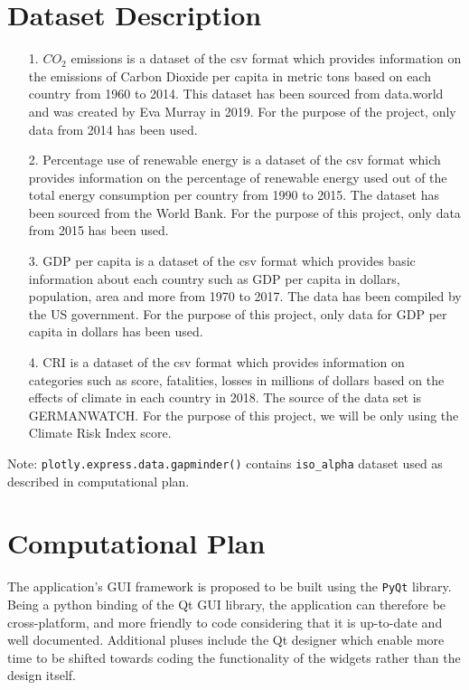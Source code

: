 \documentclass[fontsize=11pt]{article}
\begin{document}
\section*{Dataset Description}

\begin{enumerate}
 \item [1.] $CO_2$ emissions is a dataset of the csv format which provides information on the emissions of Carbon Dioxide per capita in metric tons based on each country from 1960 to 2014.
 This dataset has been sourced from data.world and was created by Eva Murray in 2019.
 For the purpose of the project, only data from 2014 has been used.
 \item[2.] Percentage use of renewable energy is a dataset of the csv format which provides information on the percentage of renewable energy used out of the total energy consumption per country from 1990 to 2015.
 The dataset has been sourced from the World Bank.
 For the purpose of this project, only data from 2015 has been used.
 \item[3.] GDP per capita is a dataset of the csv format which provides basic information about each country such as GDP per capita in dollars, population, area and more from 1970 to 2017. The data has been compiled by the US government.
 For the purpose of this project, only data for GDP per capita in dollars has been used.
 \item[4.] CRI is a dataset of the csv format which provides information on categories such as score, fatalities, losses in millions of dollars based on the effects of climate in each country in 2018.
 The source of the data set is GERMANWATCH. For the purpose of this project, we will be only using the Climate Risk Index score.
\end{enumerate}

Note: \texttt{plotly.express.data.gapminder()} contains \texttt{iso\_alpha} dataset used as described in computational plan.

\section*{Computational Plan}

The application's GUI framework is proposed to be built using the \texttt{PyQt} library.
Being a python binding of the Qt GUI library, the application can therefore be cross-platform, and more friendly to code
considering that it is up-to-date and well documented.
Additional pluses include the Qt designer which enable more time to be shifted towards coding the functionality of the
widgets rather than the design itself. \newline
\end{document}
